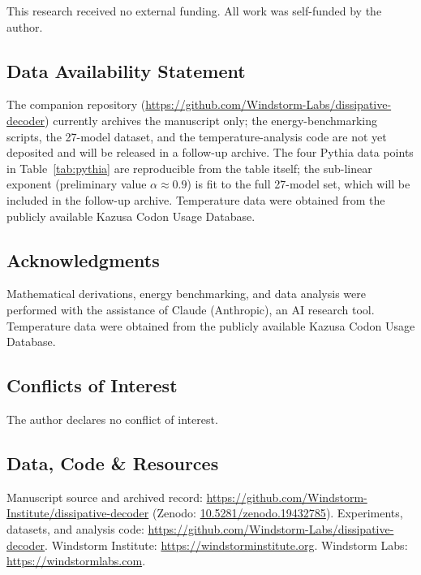 \documentclass[11pt]{article}
\begin{document}
This research received no external funding. All work was self-funded by the author.

\subsection*{Data Availability Statement}

The companion repository (\url{https://github.com/Windstorm-Labs/dissipative-decoder}) currently archives the manuscript only; the energy-benchmarking scripts, the 27-model dataset, and the temperature-analysis code are not yet deposited and will be released in a follow-up archive. The four Pythia data points in Table~\ref{tab:pythia} are reproducible from the table itself; the sub-linear exponent (preliminary value $\alpha\approx 0.9$) is fit to the full 27-model set, which will be included in the follow-up archive. Temperature data were obtained from the publicly available Kazusa Codon Usage Database.

\subsection*{Acknowledgments}

Mathematical derivations, energy benchmarking, and data analysis were performed with the assistance of Claude (Anthropic), an AI research tool. Temperature data were obtained from the publicly available Kazusa Codon Usage Database.

\subsection*{Conflicts of Interest}

The author declares no conflict of interest.

\subsection*{Data, Code \& Resources}
\noindent Manuscript source and archived record: \url{https://github.com/Windstorm-Institute/dissipative-decoder} (Zenodo: \href{https://doi.org/10.5281/zenodo.19432785}{10.5281/zenodo.19432785}). Experiments, datasets, and analysis code: \url{https://github.com/Windstorm-Labs/dissipative-decoder}. Windstorm Institute: \url{https://windstorminstitute.org}. Windstorm Labs: \url{https://windstormlabs.com}.
\end{document}
